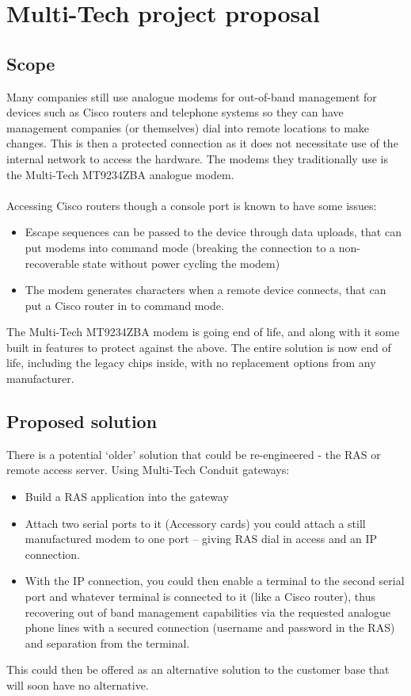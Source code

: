 \section{Multi-Tech project proposal}
\label{section:appendix-proposal}
\subsection{Scope}
Many companies still use analogue modems for out-of-band management for devices such as Cisco routers and telephone systems so they can have management companies (or themselves) dial into remote locations to make changes. This is then a protected connection as it does not necessitate use of the internal network to access the hardware. The modems they traditionally use is the Multi-Tech MT9234ZBA analogue modem. \\\\
Accessing Cisco routers though a console port is known to have some issues:
\begin{itemize}
    \item Escape sequences can be passed to the device through data uploads, that can put modems into command mode (breaking the connection to a non-recoverable state without power cycling the modem)
    \item The modem generates characters when a remote device connects, that can put a Cisco router in to command mode.
\end{itemize}
The Multi-Tech MT9234ZBA modem is going end of life, and along with it some built in features to protect against the above. The entire solution is now end of life, including the legacy chips inside, with no replacement options from any manufacturer. 

\subsection{Proposed solution}
There is a potential ‘older’ solution that could be re-engineered - the RAS or remote access server. Using Multi-Tech Conduit gateways:
\begin{itemize}
    \item Build a RAS application into the gateway
    \item Attach two serial ports to it (Accessory cards) you could attach a still manufactured modem to one port – giving RAS dial in access and an IP connection.
    \item With the IP connection, you could then enable a terminal to the second serial port and whatever terminal is connected to it (like a Cisco router), thus recovering out of band management capabilities via the requested analogue phone lines with a secured connection (username and password in the RAS) and separation from the terminal.
\end{itemize}
This could then be offered as an alternative solution to the customer base that will soon have no alternative.

